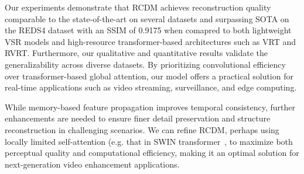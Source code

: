 \documentclass[11pt]{article}
\begin{document}
Our experiments demonstrate that RCDM achieves reconstruction quality comparable to the state-of-the-art on several datasets and surpassing SOTA on the REDS4 dataset with an SSIM of 0.9175 when comapred to both lightweight VSR models and high-resource transformer-based architectures such as VRT and RVRT. 
Furthermore, our qualitative and quantitative results validate the  generalizability across diverse datasets. By prioritizing convolutional efficiency over transformer-based global attention, our model offers a practical solution for real-time applications such as video streaming, surveillance, and edge computing.

 While memory-based feature propagation improves temporal consistency, further enhancements are needed to ensure finer detail preservation and structure reconstruction in challenging scenarios. We can refine RCDM, perhaps using locally limited self-attention (e.g. that in SWIN transformer~\cite{liu2021swin}, to maximize both perceptual quality and computational efficiency, making it an optimal solution for next-generation video enhancement applications.





% 
\end{document}
